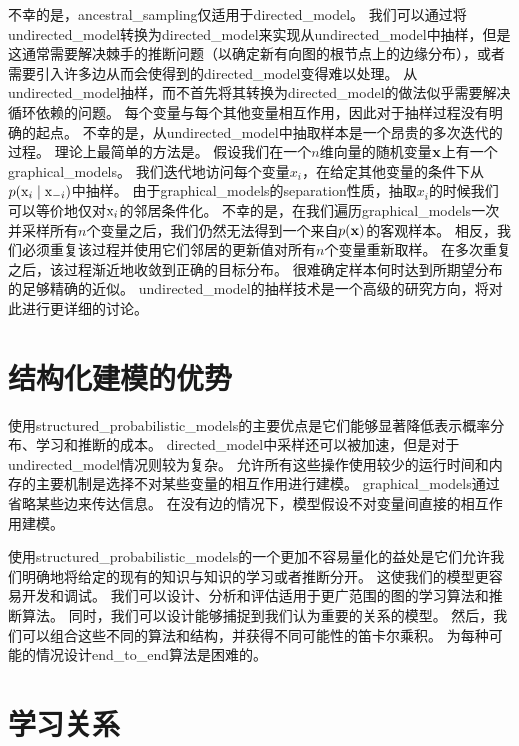 不幸的是，\gls{ancestral_sampling}仅适用于\gls{directed_model}。 
我们可以通过将\gls{undirected_model}转换为\gls{directed_model}来实现从\gls{undirected_model}中抽样，但是这通常需要解决棘手的推断问题（以确定新有向图的根节点上的边缘分布），或者需要引入许多边从而会使得到的\gls{directed_model}变得难以处理。
从\gls{undirected_model}抽样，而不首先将其转换为\gls{directed_model}的做法似乎需要解决循环依赖的问题。 
每个变量与每个其他变量相互作用，因此对于抽样过程没有明确的起点。
不幸的是，从\gls{undirected_model}中抽取样本是一个昂贵的多次迭代的过程。
理论上最简单的方法是。
假设我们在一个$n$维向量的随机变量$\mathbf{x}$上有一个\gls{graphical_models}。 
我们迭代地访问每个变量$x_i$，在给定其他变量的条件下从$p(\mathrm{x}_i \mid \mathrm{x}_{-i})$中抽样。
由于\gls{graphical_models}的\gls{separation}性质，抽取$x_i$的时候我们可以等价地仅对$\mathrm{x}_i$的邻居条件化。
不幸的是，在我们遍历\gls{graphical_models}一次并采样所有$n$个变量之后，我们仍然无法得到一个来自$p(\mathbf{x})$的客观样本。
相反，我们必须重复该过程并使用它们邻居的更新值对所有$n$个变量重新取样。
在多次重复之后，该过程渐近地收敛到正确的目标分布。
很难确定样本何时达到所期望分布的足够精确的近似。
\gls{undirected_model}的抽样技术是一个高级的研究方向，将对此进行更详细的讨论。




\section{结构化建模的优势}
\label{sec:advantages_of_structured_modelling}


使用\gls{structured_probabilistic_models}的主要优点是它们能够显著降低表示概率分布、学习和推断的成本。
\gls{directed_model}中采样还可以被加速，但是对于\gls{undirected_model}情况则较为复杂。
允许所有这些操作使用较少的运行时间和内存的主要机制是选择不对某些变量的相互作用进行建模。
\gls{graphical_models}通过省略某些边来传达信息。
在没有边的情况下，模型假设不对变量间直接的相互作用建模。


使用\gls{structured_probabilistic_models}的一个更加不容易量化的益处是它们允许我们明确地将给定的现有的知识与知识的学习或者推断分开。
这使我们的模型更容易开发和调试。 
我们可以设计、分析和评估适用于更广范围的图的学习算法和推断算法。
同时，我们可以设计能够捕捉到我们认为重要的关系的模型。
然后，我们可以组合这些不同的算法和结构，并获得不同可能性的笛卡尔乘积。
为每种可能的情况设计\gls{end_to_end}算法是困难的。



\section{学习关系}
\label{sec:learning_about_dependencies}

